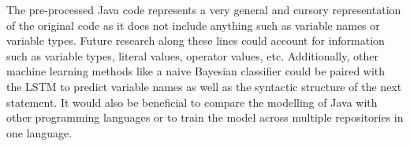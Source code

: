 \documentclass{article}
\begin{document}
The pre-processed Java code represents a very general and cursory
representation of the original code as it does not include anything such
as variable names or variable types. Future research along these lines
could account for information such as variable types, literal values,
operator values, etc. Additionally, other machine learning methods like
a naive Bayesian classifier could be paired with the LSTM to predict
variable names as well as the syntactic structure of the next statement.
It would also be beneficial to compare the modelling of Java with other
programming languages or to train the model across multiple repositories
in one language.







%
\end{document}
